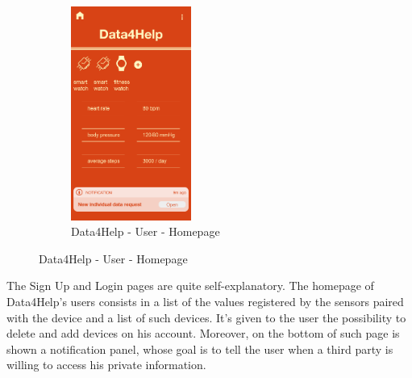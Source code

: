 \begin{figure}[H]
\begin{subfigure}{.33\textwidth}
\end{subfigure}
\begin{subfigure}{.33\textwidth}
  \centering
  \includegraphics[width = .9\linewidth, height = 7cm, keepaspectratio]{./Images/Mockups/Data4Help/D4HU/D4HU_Homepage.png}
  \caption{Data4Help - User - Homepage}
\end{subfigure}
\end{figure}

  The Sign Up and Login pages are quite self-explanatory.
  The homepage of Data4Help's users consists in a list of the values registered by the sensors paired with the device and a list of such devices. It's given to the user the possibility to delete and add devices on his account. Moreover, on the bottom of such page is shown a notification panel, whose goal is to tell the user when a third party is willing to access his private information.


